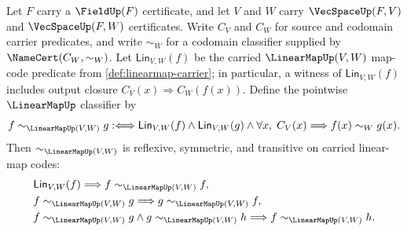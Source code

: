 \begin{theorem}
\label{thm:linearmap-pointwise-classifier-equivalence}
Let $F$ carry a $\FieldUp(F)$ certificate, and let $V$ and $W$ carry $\VecSpaceUp(F,V)$ and $\VecSpaceUp(F,W)$ certificates. Write $C_V$ and $C_W$ for source and codomain carrier predicates, and write $\sim_W$ for a codomain classifier supplied by $\NameCert(C_W,\sim_W)$. Let $\mathsf{Lin}_{V,W}(f)$ be the carried $\LinearMapUp(V,W)$ map-code predicate from \autoref{def:linearmap-carrier}; in particular, a witness of $\mathsf{Lin}_{V,W}(f)$ includes output closure $C_V(x)\Longrightarrow C_W(f(x))$. Define the pointwise $\LinearMapUp$ classifier by
$$
f\sim_{\LinearMapUp(V,W)}g
:\Longleftrightarrow
\mathsf{Lin}_{V,W}(f)\land\mathsf{Lin}_{V,W}(g)\land
\forall x,\; C_V(x)\Longrightarrow f(x)\sim_W g(x).
$$
Then $\sim_{\LinearMapUp(V,W)}$ is reflexive, symmetric, and transitive on carried linear-map codes:
$$
\begin{aligned}
&\mathsf{Lin}_{V,W}(f)\Longrightarrow f\sim_{\LinearMapUp(V,W)}f,\\
&f\sim_{\LinearMapUp(V,W)}g\Longrightarrow g\sim_{\LinearMapUp(V,W)}f,\\
&f\sim_{\LinearMapUp(V,W)}g\land g\sim_{\LinearMapUp(V,W)}h
\Longrightarrow f\sim_{\LinearMapUp(V,W)}h.
\end{aligned}
$$
\end{theorem}
